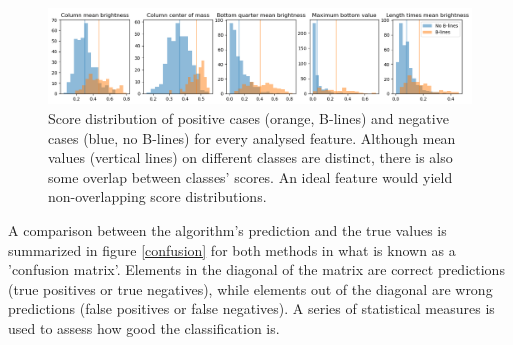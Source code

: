 \documentclass[12pt]{article} %
\begin{document}
	
\begin{figure}[h]
\centering
\includegraphics[width=\textwidth]{figuras/score_overview.png}
\caption{\small Score distribution of positive cases (orange, B-lines) and negative cases (blue, no B-lines) for every analysed feature. Although mean values (vertical lines) on different classes are distinct, there is also some overlap between classes' scores. An ideal feature would yield non-overlapping score distributions.}
\label{scores}
\end{figure}


	A comparison between the algorithm's prediction and the true values is summarized in figure \ref{confusion} for both methods in what is known as a 'confusion matrix'. Elements in the diagonal of the matrix are correct predictions (true positives or true negatives), while elements out of the diagonal are wrong predictions (false positives or false negatives). A series of statistical measures is used to assess how good the classification is. 
	
\end{document}
